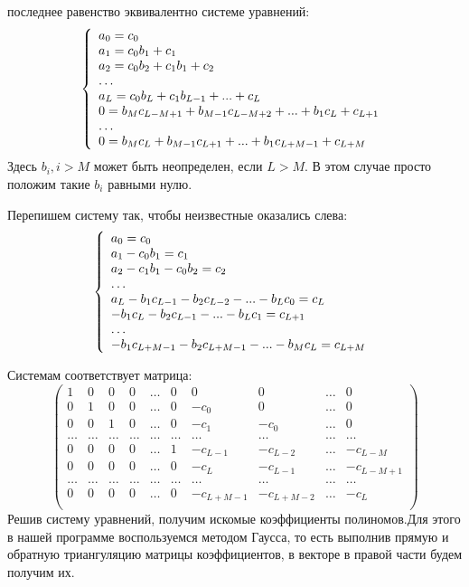 \documentclass[a4paper,14pt]{report}
\begin{document}
последнее равенство эквивалентно системе уравнений:\\
\[
	\left\{
		\begin{array}{l}
			a_0 = c_0\\ 
			a_1 = c_0b_1 + c_1\\
			a_2 = c_0b_2 + c_1b_1 + c_2\\
			\ldots\\
			a_L = c_0b_L + c_1b_{L-1} + ... + c_L\\
			0 = b_Mc_{L-M+1} + b_{M-1}c_{L-M+2} + ... + b_1c_L + c_{L+1}\\
			\ldots\\
			0 = b_Mc_L + b_{M-1}c_{L+1} + ... + b_1c_{L+M-1} + c_{L+M}
		\end{array}
		\right. \\
	\]
Здесь $b_i, i>M$ может быть неопределен, если $L>M$. В этом случае просто 
положим такие $b_i$ равными нулю.

Перепишем систему так, чтобы неизвестные оказались слева:
\[
	\left\{
		\begin{array}{l}
			a_0 = c_0\\ 
			a_1 - c_0b_1 = c_1\\
			a_2 - c_1b_1 - c_0b_2 = c_2\\
			\ldots\\
			a_L - b_1c_{L-1} - b_2c_{L-2} - ... - b_Lc_0=  c_L\\
			- b_1c_L - b_2c_{L-1} - ... - b_Lc_1 = c_{L+1}\\
			\ldots\\
			- b_1c_{L+M-1} - b_2c_{L+M-1} - ... - b_Mc_{L} = c_{L+M} 
		\end{array}
		\right. \\
	\]

Системам соответствует матрица:
$$
	\begin{pmatrix}
		1	&	0	&	0	&	0	&	\ldots	&	0	&	0	&	0	&	\ldots	&	0	\\
		0	&	1	&	0	&	0	&	\ldots	&	0	&	-c_0	&	0	&	\ldots	&	0	\\
		0	&	0	&	1	&	0	&	\ldots	&	0	&	-c_1	&	-c_0	&	\ldots	&	0	\\
		\ldots	&	\ldots	&	\ldots	&	\ldots	&	\ldots	&	\ldots	&	\ldots	&	\ldots	&	\ldots	&	\ldots	\\
		0	&	0	&	0	&	0	&	\ldots	&	1	&-c_{L-1}	&-c_{L-2}	&	\ldots	&-c_{L-M}	\\
		0	&	0	&	0	&	0	&	\ldots	&	0	&	-c_L	&-c_{L-1}	&	\ldots	&-c_{L-M+1}	\\
		\ldots	&	\ldots	&	\ldots	&	\ldots	&	\ldots	&	\ldots	&	\ldots	&	\ldots	&	\ldots	&	\ldots	\\
		0	&	0	&	0	&	0	&	\ldots	&	0	&-c_{L+M-1}	&-c_{L+M-2}	&	\ldots	&-c_{L}	\\
	\end{pmatrix}
	$$
Решив систему уравнений, получим искомые коэффициенты полиномов.Для этого в нашей программе воспользуемся методом Гаусса,
то есть выполнив прямую и обратную триангуляцию матрицы коэффициентов, в векторе в правой части будем получим их.
\clearpage
\end{document}
